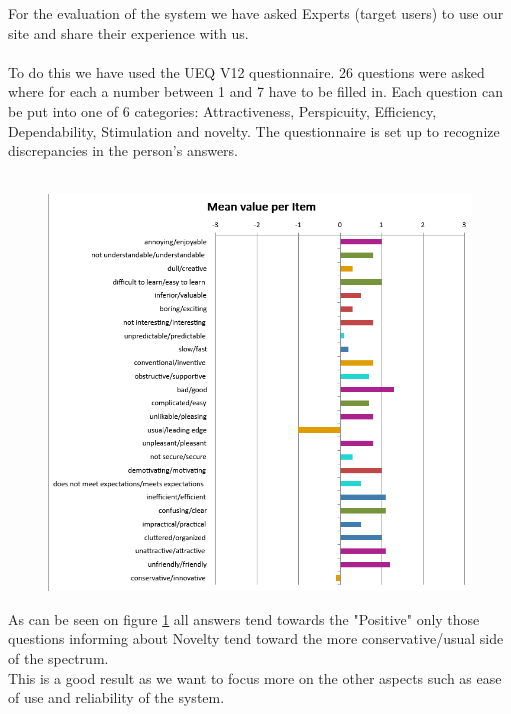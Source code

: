 \documentclass{article}
\begin{document}
	For the evaluation of the system we have asked Experts (target users) to use our site and share their experience with us.\\
	\\ 
	To do this we have used the UEQ V12 questionnaire. 26 questions were asked where for each a number between 1 and 7 have to be filled in. Each question can be put into one of 6 categories: Attractiveness, Perspicuity, Efficiency, Dependability, Stimulation and novelty. The questionnaire is set up to recognize discrepancies in the person's answers.\\
	\\
	\begin{figure}[h]
		\centering
		\includegraphics[width=\linewidth]{./Screenshots/Mean_value_per_item.png}
		\label{fig:mean_value}
	\end{figure}
	\par
	
	As can be seen on figure \ref{fig:mean_value} all answers tend towards the "Positive" only those questions informing about Novelty tend toward the more conservative/usual side of the spectrum.\\
	This is a good result as we want to focus more on the other aspects such as ease of use and reliability of the system.\\
	
\end{document}
